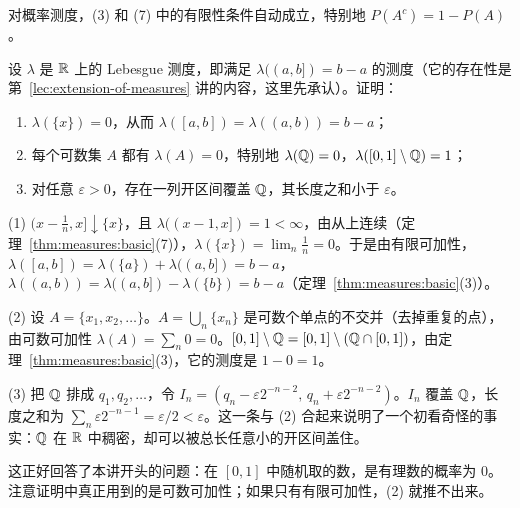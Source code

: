 对概率测度，(3) 和 (7) 中的有限性条件自动成立，特别地 $P(A^c)=1-P(A)$。

\begin{workedexample}\label{we:measures:rationals}
设 $\lambda$ 是 $\mathbb{R}$ 上的 Lebesgue 测度，即满足 $\lambda((a,b])=b-a$ 的测度（它的存在性是第~\ref{lec:extension-of-measures} 讲的内容，这里先承认）。证明：
\begin{enumerate}
\item $\lambda(\{x\})=0$，从而 $\lambda([a,b])=\lambda((a,b))=b-a$；
\item 每个可数集 $A$ 都有 $\lambda(A)=0$，特别地 $\lambda(\mathbb{Q})=0$，$\lambda([0,1]\setminus\mathbb{Q})=1$；
\item 对任意 $\varepsilon>0$，存在一列开区间覆盖 $\mathbb{Q}$，其长度之和小于 $\varepsilon$。
\end{enumerate}
\end{workedexample}
\begin{solution}
(1) $(x-\frac1n,x]\downarrow\{x\}$，且 $\lambda((x-1,x])=1<\infty$，由从上连续（定理~\ref{thm:measures:basic}(7)），$\lambda(\{x\})=\lim_n\frac1n=0$。于是由有限可加性，$\lambda([a,b])=\lambda(\{a\})+\lambda((a,b])=b-a$，$\lambda((a,b))=\lambda((a,b])-\lambda(\{b\})=b-a$（定理~\ref{thm:measures:basic}(3)）。

(2) 设 $A=\{x_1,x_2,\dots\}$。$A=\bigcup_n\{x_n\}$ 是可数个单点的不交并（去掉重复的点），由可数可加性 $\lambda(A)=\sum_n0=0$。$[0,1]\setminus\mathbb{Q}=[0,1]\setminus(\mathbb{Q}\cap[0,1])$，由定理~\ref{thm:measures:basic}(3)，它的测度是 $1-0=1$。

(3) 把 $\mathbb{Q}$ 排成 $q_1,q_2,\dots$，令 $I_n=(q_n-\varepsilon2^{-n-2},\,q_n+\varepsilon2^{-n-2})$。$I_n$ 覆盖 $\mathbb{Q}$，长度之和为 $\sum_n\varepsilon2^{-n-1}=\varepsilon/2<\varepsilon$。这一条与 (2) 合起来说明了一个初看奇怪的事实：$\mathbb{Q}$ 在 $\mathbb{R}$ 中稠密，却可以被总长任意小的开区间盖住。

这正好回答了本讲开头的问题：在 $[0,1]$ 中随机取的数，是有理数的概率为 $0$。注意证明中真正用到的是可数可加性；如果只有有限可加性，(2) 就推不出来。
\end{solution}

